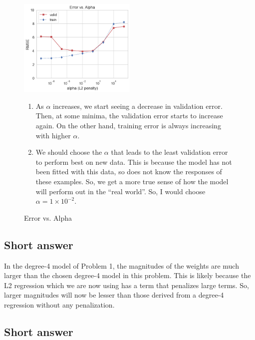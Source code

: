 \documentclass[12pt]{article}
\begin{document}
\begin{figure}[htbp]
    \centering
    \includegraphics[width=0.5\textwidth]{2a.png}
    \caption{Error vs. Alpha}
    \label{fig:2a}

    \begin{enumerate}[label=(\roman*)]
        \item As $\alpha$ increases, we start seeing a decrease in validation error. Then,
        at some minima, the validation error starts to increase again. On the
        other hand, training error is always increasing with higher $\alpha$.
        \item We should choose the $\alpha$ that leads to the least validation 
        error to perform best on new data. This is because the model has not
        been fitted with this data, so does not know the responses of these
        examples. So, we get a more true sense of how the model will perform
        out in the ``real world''. So, I would choose $\alpha = 1 \times 10^{-2}$.
    \end{enumerate}
\end{figure}

\subsection{Short answer}
In the degree-4 model of Problem 1, the magnitudes of the weights are much
larger than the chosen degree-4 model in this problem. This is likely because
the L2 regression which we are now using has a term that penalizes large terms.
So, larger magnitudes will now be lesser than those derived from a degree-4
regression without any penalization. 

\subsection{Short answer}
\end{document}

